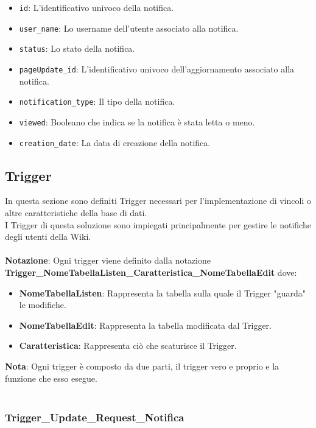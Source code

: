 \documentclass{article}
\begin{document}
    \begin{itemize}
    	\item \texttt{id}: L'identificativo univoco della notifica.
    	\item \texttt{user\_name}: Lo username dell'utente associato alla notifica.
    	\item \texttt{status}: Lo stato della notifica.
    	\item \texttt{pageUpdate\_id}: L'identificativo univoco dell'aggiornamento associato alla notifica.
    	\item \texttt{notification\_type}: Il tipo della notifica.
    	\item \texttt{viewed}: Booleano che indica se la notifica è stata letta o meno.
    	\item \texttt{creation\_date}: La data di creazione della notifica.
    \end{itemize}
    
    

	\newpage
	
\subsection{Trigger}
	In questa sezione sono definiti Trigger necessari per l'implementazione di vincoli o altre caratteristiche della base di dati.
	\\
	I Trigger di questa soluzione sono impiegati principalmente per gestire le notifiche degli utenti della Wiki.
	\\\\
	\textbf{Notazione}: Ogni trigger viene definito dalla notazione \textbf{Trigger\_NomeTabellaListen\_Caratteristica\_NomeTabellaEdit} dove:
	
	\begin{itemize}
		\item \textbf{NomeTabellaListen}: Rappresenta la tabella sulla quale il Trigger "guarda" le modifiche.
		\item \textbf{NomeTabellaEdit}: Rappresenta la tabella modificata dal Trigger.
		\item \textbf{Caratteristica}: Rappresenta ci\`o che scaturisce il Trigger.
		\\
	\end{itemize}	
\textbf{Nota}: Ogni trigger \`e composto da due parti, il trigger vero e proprio e la funzione che esso esegue.
\\\\

	
	\subsubsection{Trigger\_Update\_Request\_Notifica}
	
\end{document}
